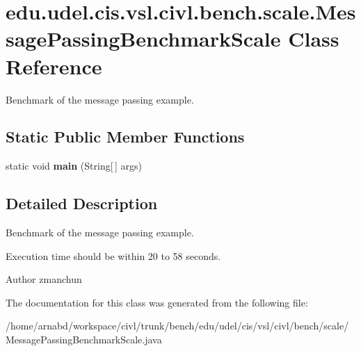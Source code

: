 \hypertarget{classedu_1_1udel_1_1cis_1_1vsl_1_1civl_1_1bench_1_1scale_1_1MessagePassingBenchmarkScale}{}\section{edu.\+udel.\+cis.\+vsl.\+civl.\+bench.\+scale.\+Message\+Passing\+Benchmark\+Scale Class Reference}
\label{classedu_1_1udel_1_1cis_1_1vsl_1_1civl_1_1bench_1_1scale_1_1MessagePassingBenchmarkScale}


Benchmark of the message passing example.  


\subsection*{Static Public Member Functions}
\begin{DoxyCompactItemize}
\item 
\hypertarget{classedu_1_1udel_1_1cis_1_1vsl_1_1civl_1_1bench_1_1scale_1_1MessagePassingBenchmarkScale_a6391bac20426daba10da21a342915dd1}{}static void {\bfseries main} (String\mbox{[}$\,$\mbox{]} args)\label{classedu_1_1udel_1_1cis_1_1vsl_1_1civl_1_1bench_1_1scale_1_1MessagePassingBenchmarkScale_a6391bac20426daba10da21a342915dd1}

\end{DoxyCompactItemize}


\subsection{Detailed Description}
Benchmark of the message passing example. 

Execution time should be within 20 to 58 seconds.

\begin{DoxyAuthor}{Author}
zmanchun 
\end{DoxyAuthor}


The documentation for this class was generated from the following file\+:\begin{DoxyCompactItemize}
\item 
/home/arnabd/workspace/civl/trunk/bench/edu/udel/cis/vsl/civl/bench/scale/Message\+Passing\+Benchmark\+Scale.\+java\end{DoxyCompactItemize}
